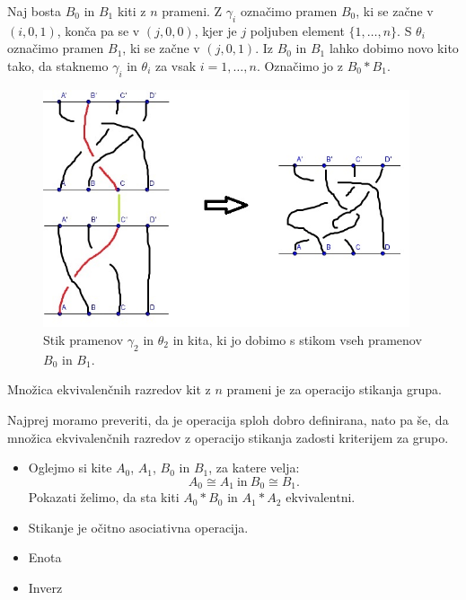 \documentclass[mat1]{fmfdelo}
\begin{document}

Naj bosta $B_0$ in $B_1$ kiti z $n$ prameni. Z $\gamma_i$ označimo pramen $B_0$, ki se začne v $(i, 0, 1)$, konča pa se v $(j, 0, 0)$, kjer je $j$ poljuben element $\{1, \ldots, n\}$. S $\theta_i$ označimo pramen $B_1$, ki se začne v $(j, 0, 1)$. Iz $B_0$ in $B_1$ lahko dobimo novo kito tako, da staknemo $\gamma_i$ in $\theta_i$ za vsak $i=1, \ldots, n$.  Označimo jo z $B_0*B_1$.

\begin{figure}[ht!]
\includegraphics[height = 7cm]{Stikanje_2}
\caption{Stik pramenov $\gamma_2$ in $\theta_2$ in kita, ki jo dobimo s stikom vseh pramenov $B_0$ in $B_1$.}
\end{figure}


\begin{trditev}
Množica ekvivalenčnih razredov kit z $n$ prameni je za operacijo stikanja grupa.
\end{trditev}

\begin{dokaz}
Najprej moramo preveriti, da je operacija sploh dobro definirana, nato pa še, da množica ekvivalenčnih razredov z operacijo stikanja zadosti kriterijem za grupo.
\begin{itemize}
\item{Oglejmo si kite $A_0$, $A_1$, $B_0$ in $B_1$, za katere velja: $$A_0 \cong A_1 \ \text{in} \ B_0 \cong B_1.$$ Pokazati želimo, da sta kiti $A_0*B_0$ in $A_1*A_2$ ekvivalentni. }
\item{Stikanje je očitno asociativna operacija.}
\item{Enota}
\item{Inverz}
\end{itemize}
\end{dokaz}
\end{document}
